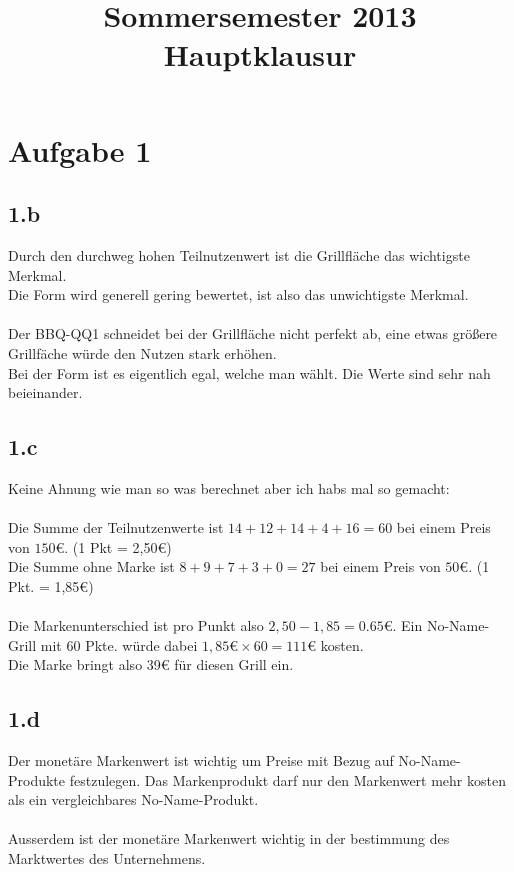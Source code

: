 

\title{Sommersemester 2013 Hauptklausur}
\maketitle

\section{Aufgabe 1}
\subsection{1.b}
    Durch den durchweg hohen Teilnutzenwert ist die Grillfläche das wichtigste Merkmal. \\
    Die Form wird generell gering bewertet, ist also das unwichtigste Merkmal. \\
    \ \\
    Der BBQ-QQ1 schneidet bei der Grillfläche nicht perfekt ab, eine etwas größere Grillfäche würde den Nutzen stark erhöhen. \\
    Bei der Form ist es eigentlich egal, welche man wählt. Die Werte sind sehr nah beieinander.

\subsection{1.c}
    Keine Ahnung wie man so was berechnet aber ich habs mal so gemacht: \\
    \ \\
    Die Summe der Teilnutzenwerte ist $14+12+14+4+16 = 60$ bei einem Preis von $150€$. (1 Pkt = 2,50€) \\
    Die Summe ohne Marke ist $8+9+7+3+0 = 27$ bei einem Preis von $50€$. (1 Pkt. = 1,85€) \\
    \ \\
    Die Markenunterschied ist pro Punkt also $2,50 - 1,85 = 0.65€$. Ein No-Name-Grill mit 60 Pkte. würde dabei $1,85€ \times 60 = 111€$ kosten. \\
    Die Marke bringt also 39€ für diesen Grill ein.

\subsection{1.d}
    Der monetäre Markenwert ist wichtig um Preise mit Bezug auf No-Name-Produkte festzulegen.
    Das Markenprodukt darf nur den Markenwert mehr kosten als ein vergleichbares No-Name-Produkt. \\
    \ \\
    Ausserdem ist der monetäre Markenwert wichtig in der bestimmung des Marktwertes des Unternehmens.

